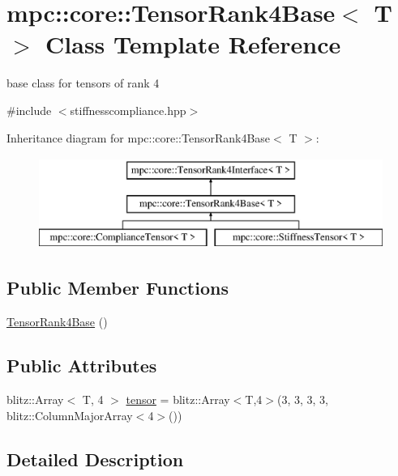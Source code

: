 \hypertarget{structmpc_1_1core_1_1_tensor_rank4_base}{}\section{mpc\+:\+:core\+:\+:Tensor\+Rank4\+Base$<$ T $>$ Class Template Reference}
\label{structmpc_1_1core_1_1_tensor_rank4_base}


base class for tensors of rank 4  




{\ttfamily \#include $<$stiffnesscompliance.\+hpp$>$}

Inheritance diagram for mpc\+:\+:core\+:\+:Tensor\+Rank4\+Base$<$ T $>$\+:\begin{figure}[H]
\begin{center}
\leavevmode
\includegraphics[height=3.000000cm]{structmpc_1_1core_1_1_tensor_rank4_base}
\end{center}
\end{figure}
\subsection*{Public Member Functions}
\begin{DoxyCompactItemize}
\item 
\mbox{\hyperlink{structmpc_1_1core_1_1_tensor_rank4_base_acfdbbb57d9d9b43e0fd55b5ecf16658b}{Tensor\+Rank4\+Base}} ()
\end{DoxyCompactItemize}
\subsection*{Public Attributes}
\begin{DoxyCompactItemize}
\item 
blitz\+::\+Array$<$ T, 4 $>$ \mbox{\hyperlink{structmpc_1_1core_1_1_tensor_rank4_base_ac599ed36ecac8367b0fa5872160988ed}{tensor}} = blitz\+::\+Array$<$T,4$>$(3, 3, 3, 3, blitz\+::\+Column\+Major\+Array$<$4$>$())
\end{DoxyCompactItemize}


\subsection{Detailed Description}
